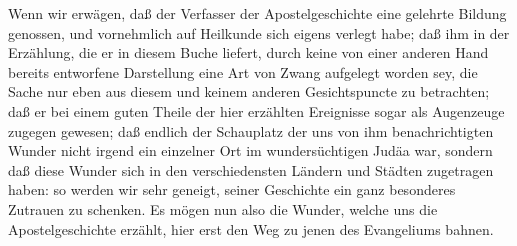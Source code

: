 Wenn wir erwägen, daß der Verfasser der Apostelgeschichte eine gelehrte Bildung genossen, und vornehmlich auf Heilkunde sich eigens verlegt habe; daß ihm in der Erzählung, die er in diesem Buche liefert, durch keine von einer anderen Hand bereits entworfene Darstellung eine Art von Zwang aufgelegt worden sey, die Sache nur eben aus diesem und keinem anderen Gesichtspuncte zu betrachten; daß er bei einem guten Theile der hier erzählten Ereignisse sogar als Augenzeuge zugegen gewesen; daß endlich der Schauplatz der uns von ihm benachrichtigten Wunder nicht irgend ein einzelner Ort im wundersüchtigen Judäa war, sondern daß diese Wunder sich in den verschiedensten Ländern und Städten zugetragen haben: so werden wir sehr geneigt, seiner Geschichte ein ganz besonderes Zutrauen zu schenken. Es mögen nun also die Wunder, welche uns die Apostelgeschichte erzählt, hier erst den Weg zu jenen des Evangeliums bahnen.
